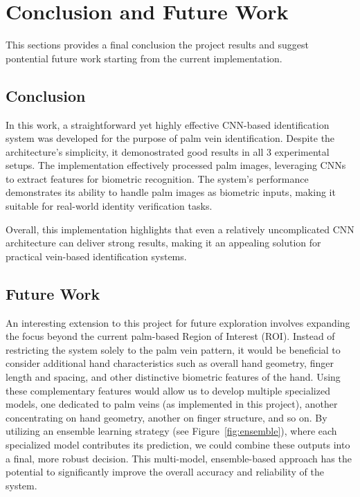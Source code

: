 \section{Conclusion and Future Work}
This sections provides a final conclusion the project results and suggest pontential future work starting from the current implementation.

\subsection{Conclusion}
In this work, a straightforward yet highly effective CNN-based identification system was developed for the purpose of palm vein identification. Despite the architecture's simplicity, it demonostrated good results in all 3 experimental setups. The implementation effectively processed palm images, leveraging CNNs to extract features for biometric recognition. The system's performance demonstrates its ability to handle palm images as biometric inputs, making it suitable for real-world identity verification tasks.

Overall, this implementation highlights that even a relatively uncomplicated CNN architecture can deliver strong results, making it an appealing solution for practical vein-based identification systems.

\subsection{Future Work}

An interesting extension to this project for future exploration involves expanding the focus beyond the current palm-based Region of Interest (ROI). Instead of restricting the system solely to the palm vein pattern, it would be beneficial to consider additional hand characteristics such as overall hand geometry, finger length and spacing, and other distinctive biometric features of the hand. Using these complementary features would allow us to develop multiple specialized models, one dedicated to palm veins (as implemented in this project), another concentrating on hand geometry, another on finger structure, and so on. By utilizing an ensemble learning strategy (see Figure~\ref{fig:ensemble}), where each specialized model contributes its prediction, we could combine these outputs into a final, more robust decision. This multi-model, ensemble-based approach has the potential to significantly improve the overall accuracy and reliability of the system.

